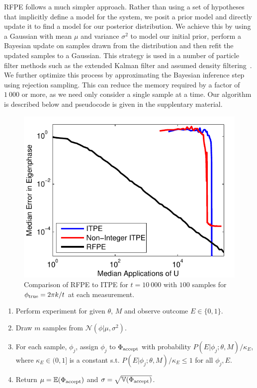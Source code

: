 \documentclass[aps,pra,amsmath,twocolumn,amssymb,superscriptaddress]{revtex4-1}
\newcommand{\app}[1]{the supplentary material}
\begin{document}
RFPE follows a much simpler approach. Rather than using a set of hypotheses that implicitly
define a model for the system, we posit a prior model and directly update it
to find a model for our posterior distribution.  We achieve this by using a
Gaussian with mean $\mu$ and variance $\sigma^2$ to model our initial prior, perform a Bayesian update on samples
drawn from the distribution and then refit the updated samples to a Gaussian.
This strategy is used in a number of particle filter methods such as the extended Kalman filter and assumed density
filtering~\cite{haykin2004kalman,opper1998bayesian}.  We further optimize
this process by approximating the Bayesian inference step using rejection
sampling.  This can reduce the memory required by a factor of $1~000$ or more,
as we need only consider a single sample at a time. Our algorithm is described
below and pseudocode is given in \app{pseudocode}.

\begin{figure}[t!]
    \begin{centering}
        \includegraphics[width=0.723\linewidth]{ITPEcmp.pdf}
    \end{centering}
    \caption{\label{fig:ITPEcmp}
     Comparison of RFPE to ITPE for $t=10~000$ with $100$ samples for $\phi_{\rm true} = 2\pi k/t$ at each measurement.  
    }
\end{figure}







\begin{enumerate}
\item Perform experiment for given $\theta$, $M$ and observe outcome $E\in \{0,1\}$.
\item Draw $m$ samples from $\mathcal{N}(\phi|\mu,\sigma^2)$.
\item For each sample, $\phi_j$, assign $\phi_j$ to $\Phi_{\rm accept}$ with probability $P(E|\phi_j;\theta,M)/\kappa_E$, where $\kappa_E\in (0,1]$ is a constant s.t. $P(E|\phi_j;\theta,M)/\kappa_E\le 1$ for all $\phi_j,E$.
\item Return $\mu = \mathbb{E}(\Phi_{\rm accept})$ and $\sigma =\sqrt{\mathbb{V}(\Phi_{\rm accept})}$.
\end{enumerate}
\end{document}
